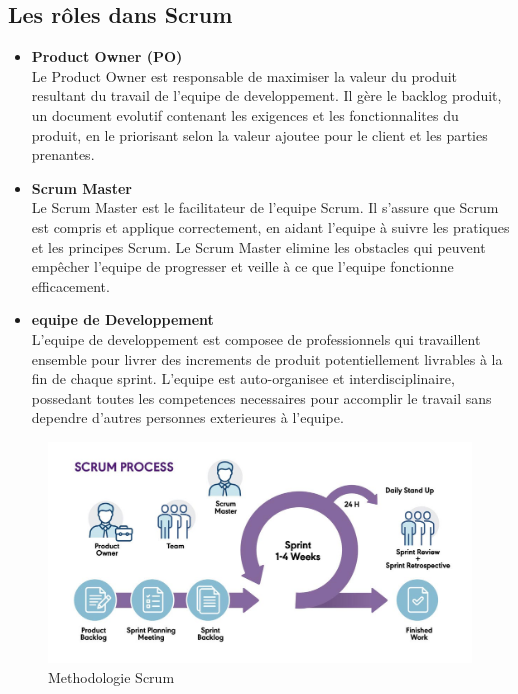 \documentclass[a4paper, 11pt, openany]{report}
\begin{document}
\subsection{Les rôles dans Scrum}

\begin{itemize}
    \item \textbf{Product Owner (PO)} \\
    Le Product Owner est responsable de maximiser la valeur du produit resultant du travail de l'equipe de developpement. Il gère le backlog produit, un document evolutif contenant les exigences et les fonctionnalites du produit, en le priorisant selon la valeur ajoutee pour le client et les parties prenantes.
    
    \item \textbf{Scrum Master} \\
    Le Scrum Master est le facilitateur de l'equipe Scrum. Il s'assure que Scrum est compris et applique correctement, en aidant l'equipe à suivre les pratiques et les principes Scrum. Le Scrum Master elimine les obstacles qui peuvent empêcher l'equipe de progresser et veille à ce que l'equipe fonctionne efficacement.
    
    \item \textbf{equipe de Developpement} \\
    L'equipe de developpement est composee de professionnels qui travaillent ensemble pour livrer des increments de produit potentiellement livrables à la fin de chaque sprint. L'equipe est auto-organisee et interdisciplinaire, possedant toutes les competences necessaires pour accomplir le travail sans dependre d'autres personnes exterieures à l'equipe.
\end{itemize}

\begin{figure}[H]
\centering
\includegraphics[width=\textwidth]{assets/images/scrum.jpg}
\caption{Methodologie Scrum}
\label{fig:methodologie_scrum}
\end{figure}
\end{document}
